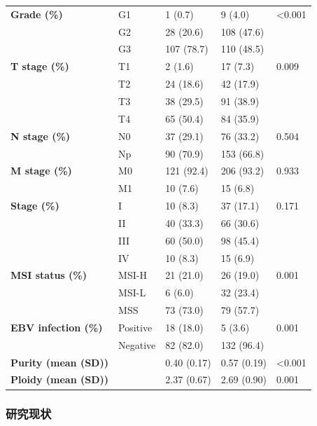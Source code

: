 \begin{table}[htbp]
\begin{tabular}{lllll}
    \textbf{Grade (\%)} & G1    & 1 (0.7) & 9 (4.0) & <0.001 \\
            & G2    & 28 (20.6) & 108 (47.6) &  \\
            & G3    & 107 (78.7) & 110 (48.5) &  \\
    \textbf{T stage (\%)} & T1    & 2 (1.6) & 17 (7.3) & 0.009 \\
            & T2    & 24 (18.6) & 42 (17.9) &  \\
            & T3    & 38 (29.5) & 91 (38.9) &  \\
            & T4    & 65 (50.4) & 84 (35.9) &  \\
    \textbf{N stage (\%)} & N0    & 37 (29.1) & 76 (33.2) & 0.504 \\
            & Np    & 90 (70.9) & 153 (66.8) &  \\
    \textbf{M stage (\%)} & M0    & 121 (92.4) & 206 (93.2) & 0.933 \\
            & M1    & 10 (7.6) & 15 (6.8) &  \\
    \textbf{Stage (\%)} & I     & 10 (8.3) & 37 (17.1) & 0.171 \\
            & II    & 40 (33.3) & 66 (30.6) &  \\
            & III   & 60 (50.0) & 98 (45.4) &  \\
            & IV    & 10 (8.3) & 15 (6.9) &  \\
    \textbf{MSI status (\%)} & MSI-H & 21 (21.0) & 26 (19.0) & 0.001 \\
            & MSI-L & 6 (6.0) & 32 (23.4) &  \\
            & MSS   & 73 (73.0) & 79 (57.7) &  \\
    \textbf{EBV infection (\%)} & Positive & 18 (18.0) & 5 (3.6) & 0.001 \\
            & Negative & 82 (82.0) & 132 (96.4) &  \\
    \textbf{Purity (mean (SD))} &       & 0.40 (0.17) & 0.57 (0.19) & <0.001 \\
    \textbf{Ploidy (mean (SD))} &       & 2.37 (0.67) & 2.69 (0.90) & 0.001 \\
    \bottomrule
    \end{tabular}%
    \label{table1}%
\end{table}%

\clearpage

\subsubsection{研究现状}


